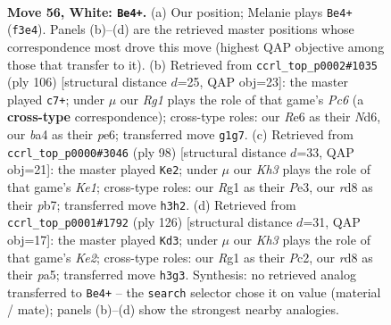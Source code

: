 \documentclass[11pt]{article}
\begin{document}
\clearpage

\begin{figure}[p]\centering
\begin{subfigure}{0.46\textwidth}\centering
\resizebox{\linewidth}{!}{%
\newchessgame
\chessboard[
  setfen={1r1r4/7k/pp2R3/8/bP6/P4B1K/8/6R1 w - - 14 56},
  showmover=false,
  pgfstyle=straightmove, color=movearrow, markmove={f3-e4}
]}
\caption{}
\end{subfigure}\hfill
\begin{subfigure}{0.46\textwidth}\centering
\resizebox{\linewidth}{!}{%
\newchessgame
\chessboard[
  setfen={3k4/5pr1/2PNp3/4P3/6r1/2K5/5R2/8 w - - 2 54},
  showmover=false,
  pgfstyle=straightmove, color=movearrow, markmove={c6-c7}
]}
\caption{}
\end{subfigure}
\\[4pt]
\begin{subfigure}{0.46\textwidth}\centering
\resizebox{\linewidth}{!}{%
\newchessgame
\chessboard[
  setfen={4k3/1p6/1r3p2/3R2p1/6P1/4PP2/8/4K3 w - - 3 50},
  showmover=false,
  pgfstyle=straightmove, color=movearrow, markmove={e1-e2}
]}
\caption{}
\end{subfigure}\hfill
\begin{subfigure}{0.46\textwidth}\centering
\resizebox{\linewidth}{!}{%
\newchessgame
\chessboard[
  setfen={6R1/3k4/8/p3p3/r5p1/6P1/2P1KP2/8 w - - 10 64},
  showmover=false,
  pgfstyle=straightmove, color=movearrow, markmove={e2-d3}
]}
\caption{}
\end{subfigure}
\caption{\textbf{Move 56, White: \texttt{Be4+}.} (a) Our position; Melanie plays \texttt{Be4+} (\texttt{f3e4}). Panels (b)--(d) are the retrieved master positions whose correspondence most drove this move (highest QAP objective among those that transfer to it). (b) Retrieved from \texttt{ccrl\_top\_p0002\#1035} (ply 106) [structural distance $d$=25, QAP obj=23]: the master played \texttt{c7+}; under $\mu$ our \emph{Rg1} plays the role of that game's \emph{Pc6} (a \textbf{cross-type} correspondence); cross-type roles: our \emph{R}e6 as their \emph{N}d6, our \emph{b}a4 as their \emph{p}e6; transferred move \texttt{g1g7}. (c) Retrieved from \texttt{ccrl\_top\_p0000\#3046} (ply 98) [structural distance $d$=33, QAP obj=21]: the master played \texttt{Ke2}; under $\mu$ our \emph{Kh3} plays the role of that game's \emph{Ke1}; cross-type roles: our \emph{R}g1 as their \emph{P}e3, our \emph{r}d8 as their \emph{p}b7; transferred move \texttt{h3h2}. (d) Retrieved from \texttt{ccrl\_top\_p0001\#1792} (ply 126) [structural distance $d$=31, QAP obj=17]: the master played \texttt{Kd3}; under $\mu$ our \emph{Kh3} plays the role of that game's \emph{Ke2}; cross-type roles: our \emph{R}g1 as their \emph{P}c2, our \emph{r}d8 as their \emph{p}a5; transferred move \texttt{h3g3}. Synthesis: no retrieved analog transferred to \texttt{Be4+} -- the \texttt{search} selector chose it on value (material / mate); panels (b)--(d) show the strongest nearby analogies.}
\label{fig:thought-m110}
\end{figure}
\end{document}
